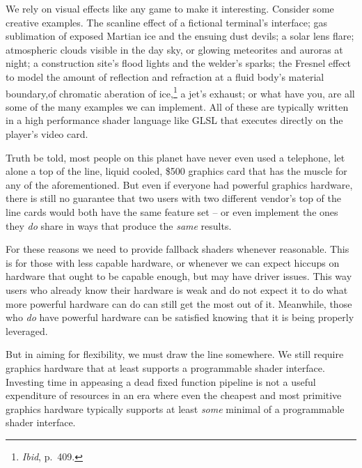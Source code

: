 We rely on visual effects like any game to make it interesting. Consider some creative examples. The scanline effect of a fictional terminal's interface; gas sublimation of exposed Martian ice and the ensuing dust devils; a solar lens flare; atmospheric  clouds visible in the day sky, or glowing meteorites and auroras at night; a construction site's flood lights and the welder's sparks; the Fresnel effect to model the amount of reflection and refraction at a fluid body's material boundary, of chromatic aberation of ice,\footnote{{\it Ibid}, p.~409.} a jet's exhaust; or what have you, are all some of the many examples we can implement. All of these are typically written in a high performance shader language like GLSL that executes directly on the player's video card.

Truth be told, most people on this planet have never even used a telephone, let alone a top of the line, liquid cooled, \$500 graphics card that has the muscle for any of the aforementioned. But even if everyone had powerful graphics hardware, there is still no guarantee that two users with two different vendor's top of the line cards would both have the same feature set -- or even implement the ones they {\it do} share in ways that produce the {\it same} results. 

For these reasons we need to provide fallback shaders whenever reasonable. This is for those with less capable hardware, or whenever we can expect hiccups on hardware that ought to be capable enough, but may have driver issues. This way users who already know their hardware is weak and do not expect it to do what more powerful hardware can do can still get the most out of it. Meanwhile, those who {\it do} have powerful hardware can be satisfied knowing that it is being properly leveraged.

But in aiming for flexibility, we must draw the line somewhere. We still require graphics hardware that at least supports a programmable shader interface. Investing time in appeasing a dead fixed function pipeline is not a useful expenditure of resources in an era where even the cheapest and most primitive graphics hardware typically supports at least {\it some} minimal of a programmable shader interface.


